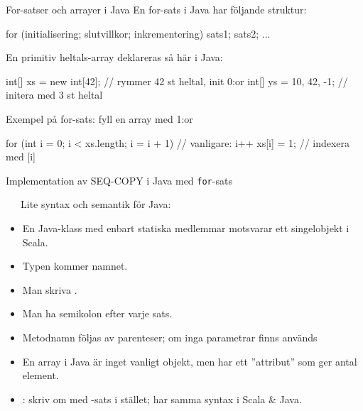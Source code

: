 \begin{Slide}{For-satser och arrayer i Java}\SlideFontSmall
En for-sats i Java har följande struktur:
\begin{Code}[language=Java, basicstyle=\fontsize{10}{12}\ttfamily\selectfont]
for (initialisering; slutvillkor; inkrementering) {
    sats1;
    sats2;
    ...
}
\end{Code}
En primitiv heltals-array deklareras så här i Java:
\begin{Code}[language=Java, basicstyle=\fontsize{9}{11}\ttfamily\selectfont]
int[] xs = new int[42];  // rymmer 42 st heltal, init 0:or
int[] ys = {10, 42, -1}; // initera med 3 st heltal
\end{Code}
Exempel på for-sats: fyll en array med 1:or
\begin{Code}[language=Java, basicstyle=\fontsize{9}{11}\ttfamily\selectfont]
for (int i = 0; i < xs.length; i = i + 1){ // vanligare: i++
  xs[i] = 1;                             // indexera med [i]
}
\end{Code}

\end{Slide}
  
\begin{Slide}{Implementation av SEQ-COPY i Java med \texttt{for}-sats}
\begin{minipage}{0.55\textwidth}
\vspace{-0.5em}
\end{minipage}
\begin{minipage}{0.44\textwidth}\SlideFontTiny\vspace{-1.5em}\ifkompendium\small\fi
~~~Lite syntax och semantik för Java:
\begin{itemize}
\item En Java-klass med enbart statiska medlemmar motsvarar ett singelobjekt i Scala.

\item Typen kommer  namnet.

\item Man  skriva .

\item Man  ha semikolon efter varje sats.

\item Metodnamn  följas av parenteser; om inga parametrar finns används \code{()}

\item En array i Java är inget vanligt objekt, men har ett ''attribut''  som ger antal element.

\item {}: skriv om med -sats i stället; har samma syntax i Scala \& Java.

\end{itemize}
\end{minipage}

\end{Slide}
  


